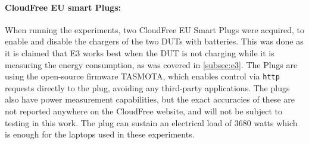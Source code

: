 \paragraph*{CloudFree EU smart Plugs:}

When running the experiments, two CloudFree EU Smart Plugs\cite{CloudFreeEUSMartPlug} were acquired, to enable and disable the chargers of the two DUTs with batteries. This was done as it is claimed that E3 works best when the DUT is not charging while it is measuring the energy consumption, as was covered in \cref{subsec:e3}. The Plugs are using the open-source firmware TASMOTA\cite{TomatoGit}, which enables control via \texttt{http} requests directly to the plug, avoiding any third-party applications. The plugs also have power measurement capabilities, but the exact accuracies of these are not reported anywhere on the CloudFree website, and will not be subject to testing in this work. The plug can sustain an electrical load of 3680 watts which is enough for the laptops used in these experiments.\cite{CloudFreeEUSMartPlug}
